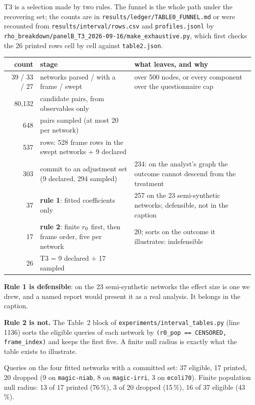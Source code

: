 T3 is a selection made by two rules. The funnel is the whole path under the recovering set; the
counts are in \texttt{results/ledger/TABLE0\_FUNNEL.md} or were recounted from
\texttt{results/interval/rows.csv} and \texttt{profiles.jsonl} by
\nolinkurl{rho_breakdown/panelB_T3_2026-09-16/make_exhaustive.py}, which first checks the 26 printed
rows cell by cell against \texttt{table2.json}.

\begin{center}\footnotesize
\begin{tabular}{@{}rp{6.2cm}p{6.6cm}@{}}
\toprule
count & stage & what leaves, and why \\
\midrule
39 / 33 / 27 & networks parsed / with a frame / swept & over 500 nodes, or every component over the questionnaire cap \\
80{,}132 & candidate pairs, from observables only & \\
648 & pairs sampled (at most 20 per network) & \\
537 & rows: 528 frame rows in the swept networks + 9 declared & \\
303 & commit to an adjustment set (9 declared, 294 sampled) & 234: on the analyst's graph the outcome cannot descend from the treatment \\
37 & \textbf{rule 1}: fitted coefficients only & 257 on the 23 semi-synthetic networks; \textcolor{verdesc}{defensible}, not in the caption \\
17 & \textbf{rule 2}: finite $r_{0}$ first, then frame order, five per network & 20; sorts on the outcome it illustrates: \textcolor{vermesc}{indefensible} \\
\midrule
26 & T3 = 9 declared + 17 sampled & \\
\bottomrule
\end{tabular}
\end{center}

\textbf{Rule 1 is defensible}: on the 23 semi-synthetic networks the effect size is one we drew, and a
named report would present it as a real analysis. It belongs in the caption.

\textbf{Rule 2 is not.} The Table~2 block of \texttt{experiments/interval\_tables.py} (line 1136) sorts the
eligible queries of each network by \texttt{(r0\_pop == CENSORED, frame\_index)} and keeps the first five.
A finite null radius is exactly what the table exists to illustrate.

\begin{medido}
Queries on the four fitted networks with a committed set: 37 eligible, 17 printed, 20 dropped (9 on
\texttt{magic-niab}, 8 on \texttt{magic-irri}, 3 on \texttt{ecoli70}). Finite population null radius:
13 of 17 printed (76\,\%), 3 of 20 dropped (15\,\%), 16 of 37 eligible (43\,\%).
\end{medido}

